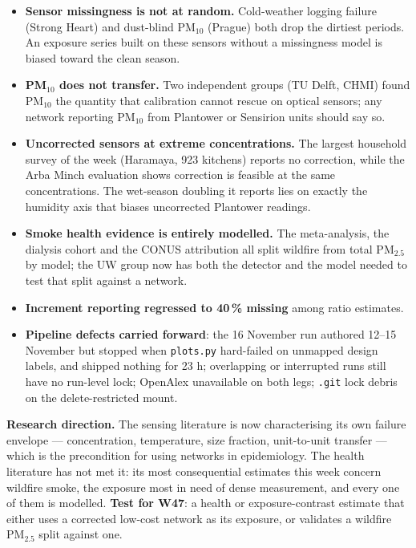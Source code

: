 \documentclass[10pt]{article}
\begin{document}
\footnotesize
\begin{itemize}
\item \textbf{Sensor missingness is not at random.} Cold-weather logging failure (Strong Heart) and dust-blind
PM$_{10}$ (Prague) both drop the dirtiest periods. An exposure series built on these sensors without a missingness
model is biased toward the clean season.

\item \textbf{PM$_{10}$ does not transfer.} Two independent groups (TU Delft, CHMI) found PM$_{10}$ the quantity that
calibration cannot rescue on optical sensors; any network reporting PM$_{10}$ from Plantower or Sensirion units should
say so.

\item \textbf{Uncorrected sensors at extreme concentrations.} The largest household survey of the week (Haramaya,
923 kitchens) reports no correction, while the Arba Minch evaluation shows correction is feasible at the same
concentrations. The wet-season doubling it reports lies on exactly the humidity axis that biases uncorrected
Plantower readings.

\item \textbf{Smoke health evidence is entirely modelled.} The meta-analysis, the dialysis cohort and the CONUS
attribution all split wildfire from total PM$_{2.5}$ by model; the UW group now has both the detector and the model
needed to test that split against a network.

\item \textbf{Increment reporting regressed to 40\,\% missing} among ratio estimates.

\item \textbf{Pipeline defects carried forward}: the 16 November run authored 12--15 November but stopped when
\texttt{plots.py} hard-failed on unmapped design labels, and shipped nothing for 23 h; overlapping or interrupted
runs still have no run-level lock; OpenAlex unavailable on both legs; \texttt{.git} lock debris on the
delete-restricted mount.
\end{itemize}

\vspace{1.5mm}
\textbf{Research direction.} The sensing literature is now characterising its own failure envelope ---
concentration, temperature, size fraction, unit-to-unit transfer --- which is the precondition for using networks in
epidemiology. The health literature has not met it: its most consequential estimates this week concern wildfire
smoke, the exposure most in need of dense measurement, and every one of them is modelled. \textbf{Test for W47}: a
health or exposure-contrast estimate that either uses a corrected low-cost network as its exposure, or validates a
wildfire PM$_{2.5}$ split against one.
\end{document}
